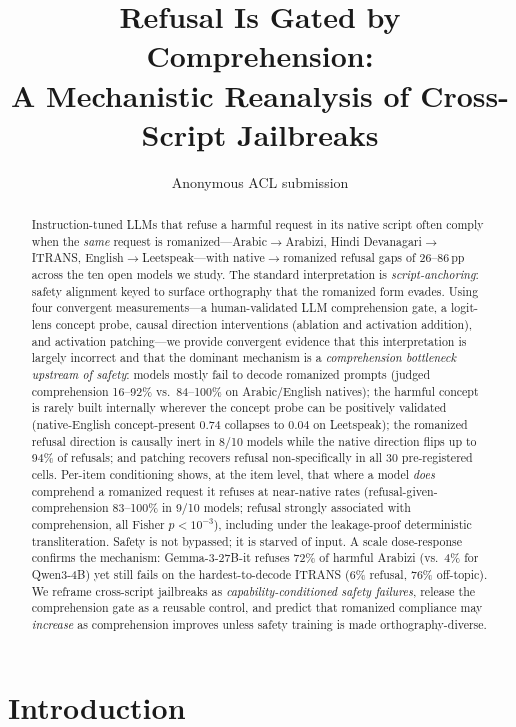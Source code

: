 \documentclass[11pt]{article}
\title{Refusal Is Gated by Comprehension:\\
A Mechanistic Reanalysis of Cross-Script Jailbreaks}
\author{Anonymous ACL submission}
\newcommand{\arr}{$\rightarrow$}
\newcommand{\pp}{\,pp}
\begin{document}
\maketitle

\begin{abstract}
Instruction-tuned LLMs that refuse a harmful request in its native script often comply when the \emph{same} request is romanized---Arabic\arr Arabizi, Hindi Devanagari\arr ITRANS, English\arr Leetspeak---with native\arr romanized refusal gaps of 26--86\pp{} across the ten open models we study. The standard interpretation is \emph{script-anchoring}: safety alignment keyed to surface orthography that the romanized form evades. Using four convergent measurements---a human-validated LLM comprehension gate, a logit-lens concept probe, causal direction interventions (ablation and activation addition), and activation patching---we provide convergent evidence that this interpretation is largely incorrect and that the dominant mechanism is a \emph{comprehension bottleneck upstream of safety}: models mostly fail to decode romanized prompts (judged comprehension 16--92\% vs.\ 84--100\% on Arabic/English natives); the harmful concept is rarely built internally wherever the concept probe can be positively validated (native-English concept-present $0.74$ collapses to $0.04$ on Leetspeak); the romanized refusal direction is causally inert in 8/10 models while the native direction flips up to 94\% of refusals; and patching recovers refusal non-specifically in all 30 pre-registered cells. Per-item conditioning shows, at the item level, that where a model \emph{does} comprehend a romanized request it refuses at near-native rates (refusal-given-comprehension 83--100\% in 9/10 models; refusal strongly associated with comprehension, all Fisher $p<10^{-3}$), including under the leakage-proof deterministic transliteration. Safety is not bypassed; it is starved of input. A scale dose-response confirms the mechanism: Gemma-3-27B-it refuses 72\% of harmful Arabizi (vs.\ 4\% for Qwen3-4B) yet still fails on the hardest-to-decode ITRANS (6\% refusal, 76\% off-topic). We reframe cross-script jailbreaks as \emph{capability-conditioned safety failures}, release the comprehension gate as a reusable control, and predict that romanized compliance may \emph{increase} as comprehension improves unless safety training is made orthography-diverse.
\end{abstract}

\section{Introduction}
\end{document}
